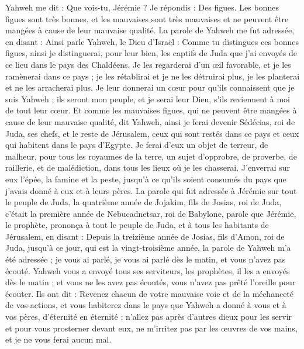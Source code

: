 \begin{multicols}{2}
Yahweh me dit : Que vois-tu, Jérémie ? Je répondis : Des figues. Les bonnes figues sont très bonnes, et les mauvaises sont très mauvaises et ne peuvent être mangées à cause de leur mauvaise qualité.
La parole de Yahweh me fut adressée, en disant :
Ainsi parle Yahweh, le Dieu d'Israël : Comme tu distingues ces bonnes figues, ainsi je distinguerai, pour leur bien, les captifs de Juda que j'ai envoyés de ce lieu dans le pays des Chaldéens.
Je les regarderai d'un œil favorable, et je les ramènerai dans ce pays ; je les rétablirai et je ne les détruirai plus, je les planterai et ne les arracherai plus.
Je leur donnerai un cœur pour qu'ils connaissent que je suis Yahweh ; ils seront mon peuple, et je serai leur Dieu, s'ils reviennent à moi de tout leur cœur.
Et comme les mauvaises figues, qui ne peuvent être mangées à cause de leur mauvaise qualité, dit Yahweh, ainsi je ferai devenir Sédécias, roi de Juda, ses chefs, et le reste de Jérusalem, ceux qui sont restés dans ce pays et ceux qui habitent dans le pays d'Egypte.
Je ferai d'eux un objet de terreur, de malheur, pour tous les royaumes de la terre, un sujet d'opprobre, de proverbe, de raillerie, et de malédiction, dans tous les lieux où je les chasserai.
J'enverrai sur eux l'épée, la famine et la peste, jusqu'à ce qu'ils soient consumés du pays que j'avais donné à eux et à leurs pères.
\VerseOne{}La parole qui fut adressée à Jérémie sur tout le peuple de Juda, la quatrième année de Jojakim, fils de Josias, roi de Juda, c'était la première année de Nebucadnetsar, roi de Babylone,
parole que Jérémie, le prophète, prononça à tout le peuple de Juda, et à tous les habitants de Jérusalem, en disant :
Depuis la treizième année de Josias, fils d'Amon, roi de Juda, jusqu'à ce jour, qui est la vingt-troisième année, la parole de Yahweh m'a été adressée ; je vous ai parlé, je vous ai parlé dès le matin, et vous n'avez pas écouté.
Yahweh vous a envoyé tous ses serviteurs, les prophètes, il les a envoyés dès le matin ; et vous ne les avez pas écoutés, vous n'avez pas prêté l'oreille pour écouter.
Ils ont dit : Revenez chacun de votre mauvaise voie et de la méchanceté de vos actions, et vous habiterez dans le pays que Yahweh a donné à vous et à vos pères, d'éternité en éternité ;
n'allez pas après d'autres dieux pour les servir et pour vous prosterner devant eux, ne m'irritez pas par les œuvres de vos mains, et je ne vous ferai aucun mal.

\end{multicols}
